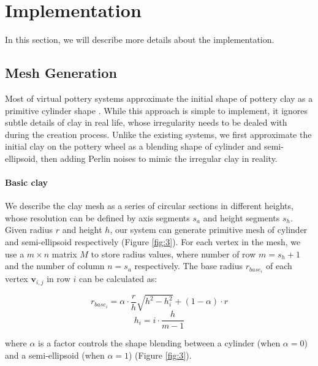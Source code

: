 \documentclass{svjour3}                     %
\begin{document}
\section{Implementation}
\label{sec:4}

In this section, we will describe more details about the implementation. 

\subsection{Mesh Generation}
\label{sec:4.1}

Most of virtual pottery systems approximate the initial shape of pottery clay as a primitive cylinder shape \cite{han2007ar,ramani2015gesture,Vinayak2016Extracting}. While this approach is simple to implement, it ignores subtle details of clay in real life, whose irregularity needs to be dealed with during the creation process. Unlike the existing systems, we first approximate the initial clay on the pottery wheel as a blending shape of cylinder and semi-ellipsoid, then adding Perlin noises to mimic the irregular clay in reality.

\paragraph{Basic clay} We describe the clay mesh as a series of circular sections in different heights, whose resolution can be defined by axis segments $s_{a}$ and height segments $s_{h}$. Given radius $r$ and height $h$, our system can generate primitive mesh of cylinder and semi-ellipsoid respectively (Figure \ref{fig:3}).
For each vertex in the mesh, we use a $m \times n$ matrix $M$ to store radius values, where number of row $m = s_{h} + 1$ and the number of column $n = s_{a}$ respectively. The base radius $r_{base_{i}}$ of each vertex $\mathbf{v}_{i,j}$ in row $i$ can be calculated as: 

\begin{equation}
r_{base_{i}} = \alpha \cdot \frac{r}{h} \sqrt{h^2 -  h_{i}^2} + (1 - \alpha) \cdot r
\end{equation}
\begin{equation}
h_{i} = i \cdot \frac{h}{m-1}
\end{equation}

where $\alpha$ is a factor controls the shape blending between a  cylinder (when $\alpha=0$) and a semi-ellipsoid (when $\alpha=1$) (Figure \ref{fig:3}).
\end{document}
